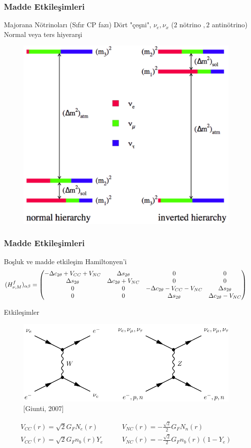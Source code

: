 \documentclass[10pt]{beamer}
\begin{document}
\begin{frame}
    \frametitle{Madde Etkileşimleri}
    \begin{outline}
        \1[\textbullet] Majorana Nötrinoları (Sıfır CP fazı)
        \1[\textbullet] Dört "çeşni", $ \nu_{e}, \nu_{x} $ ($2$ nötrino $, 2 $ antinötrino)
        \1[\textbullet] Normal veya ters hiyerarşi
    \end{outline}
    \begin{figure}[hbt!]
        \centering
        \includegraphics[width=.45\textwidth]{fig/nuHier.pdf}
    \end{figure}
\end{frame}
\begin{frame}
    \frametitle{Madde Etkileşimleri}
    Boşluk ve madde etkileşim Hamiltonyen'i
    \tiny
    \begin{align*}
        (H^{f}_{\nu,M})_{\alpha\beta} =\mqty(-\Delta c_{ 2\theta}+V_{CC}+V_{NC} & \Delta s_{ 2\theta} & 0 & 0\\ \Delta s_{ 2\theta} & \Delta c_{ 2\theta}+V_{NC} & 0 & 0 \\0 & 0 & -\Delta c_{ 2\theta}-V_{CC}-V_{NC} & \Delta s_{ 2\theta}\\ 0 & 0 & \Delta s_{ 2\theta} & \Delta c_{ 2\theta}-V_{NC} )
    \end{align*}
    \normalsize
    
    Etkileşimler
    \begin{figure}[hbt!]
        \centering
        \includegraphics[width=.65\textwidth]{fig/matFeynDiag.png}
        {\tiny [Giunti, 2007]}
    \end{figure}
    \begin{align*}
        V_{CC}(r) = \sqrt{2}G_{F}N_{e}(r) \qquad& V_{NC}(r) = -\frac{\sqrt{2}}{2}G_{F}N_{n}(r)\\
        V_{CC}(r) = \sqrt{2}G_{F}n_{b}(r)Y_{e} \qquad& V_{NC}(r) = -\frac{\sqrt{2}}{2}G_{F}n_{b}(r)(1-Y_{e})
    \end{align*}
\end{frame}
\end{document}
